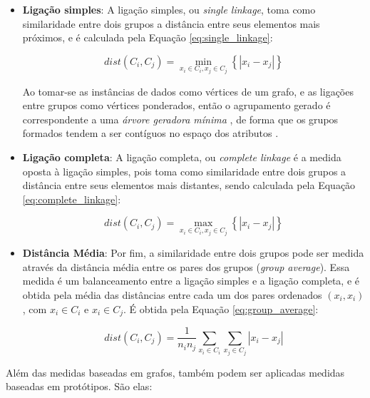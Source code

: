 \begin{itemize}
	\item \textbf{Ligação simples}: A ligação simples, ou \emph{single linkage},
	toma como similaridade entre dois grupos a distância entre seus elementos 
	mais próximos, e é calculada pela Equação \ref{eq:single_linkage}:
	
	\begin{equation}
		dist\left(C_i,C_j\right) =
			\min_{x_i \in C_i , x_j \in C_j}
				{\left\{ \left| x_i - x_j \right| \right\}}
		\label{eq:single_linkage}
	\end{equation}
	
	
	Ao tomar-se as instâncias de dados como vértices de um grafo, e as ligações 
	entre grupos como vértices ponderados, então o agrupamento gerado é
	correspondente a uma \emph{árvore geradora mínima} \cite{han2011data}, de
	forma que os grupos formados tendem a ser contíguos no espaço dos atributos
	\cite{tan2009introducao}.
	
	\item \textbf{Ligação completa}: A ligação completa, ou
	\emph{complete linkage} é a medida oposta à ligação simples, pois toma como 
	similaridade entre dois grupos a distância entre seus elementos mais
	distantes, sendo calculada pela Equação \ref{eq:complete_linkage}:
	
	\begin{equation}
		dist\left(C_i,C_j\right) =
			\max_{x_i \in C_i , x_j \in C_j}
				{\left\{ \left| x_i - x_j \right| \right\}}
		\label{eq:complete_linkage}
	\end{equation}
	
	
	\item \textbf{Distância Média}: Por fim, a similaridade entre dois grupos pode
	ser medida através da distância média entre os pares dos grupos
	(\emph{group average}). Essa medida é um balanceamento entre a ligação simples
	e a ligação completa, e é obtida pela média das distâncias entre cada um dos
	pares ordenados $(x_i,x_i)$, com $x_i \in C_i$ e $x_i \in C_j$. É obtida
	pela Equação \ref{eq:group_average}:
	
	\begin{equation}
		dist\left(C_i,C_j\right) =
			\frac{1}{n_in_j} 
			\sum_{x_i \in C_i}{
				\sum_{x_j \in C_j}{
					\left| x_i - x_j \right|
				}
			}
		\label{eq:group_average}
	\end{equation}
	
\end{itemize}

Além das medidas baseadas em grafos, também podem ser aplicadas medidas baseadas
em protótipos. São elas:

